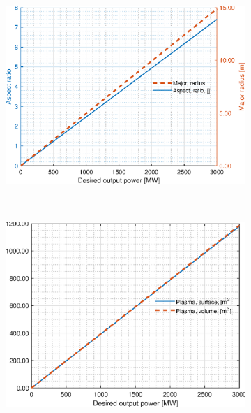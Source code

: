 \begin{figure}[H]
	\begin{subfigure}[b]{.45\textwidth}
		\includegraphics[width=\textwidth]{MatlabFigures/PE/f3.eps}
	\end{subfigure}
	~
	\begin{subfigure}[b]{.45\textwidth}
		\includegraphics[width=\textwidth]{MatlabFigures/PE/f4.eps}
	\end{subfigure}


\end{figure}
